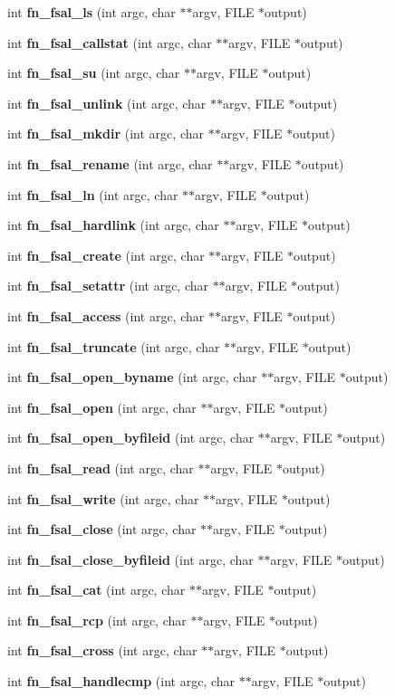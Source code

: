 \begin{CompactItemize}
int {\bf fn\_\-fsal\_\-ls} (int argc, char $\ast$$\ast$argv, FILE $\ast$output)
\item 
int {\bf fn\_\-fsal\_\-callstat} (int argc, char $\ast$$\ast$argv, FILE $\ast$output)
\item 
int {\bf fn\_\-fsal\_\-su} (int argc, char $\ast$$\ast$argv, FILE $\ast$output)
\item 
int {\bf fn\_\-fsal\_\-unlink} (int argc, char $\ast$$\ast$argv, FILE $\ast$output)
\item 
int {\bf fn\_\-fsal\_\-mkdir} (int argc, char $\ast$$\ast$argv, FILE $\ast$output)
\item 
int {\bf fn\_\-fsal\_\-rename} (int argc, char $\ast$$\ast$argv, FILE $\ast$output)
\item 
int {\bf fn\_\-fsal\_\-ln} (int argc, char $\ast$$\ast$argv, FILE $\ast$output)
\item 
int {\bf fn\_\-fsal\_\-hardlink} (int argc, char $\ast$$\ast$argv, FILE $\ast$output)
\item 
int {\bf fn\_\-fsal\_\-create} (int argc, char $\ast$$\ast$argv, FILE $\ast$output)
\item 
int {\bf fn\_\-fsal\_\-setattr} (int argc, char $\ast$$\ast$argv, FILE $\ast$output)
\item 
int {\bf fn\_\-fsal\_\-access} (int argc, char $\ast$$\ast$argv, FILE $\ast$output)
\item 
int {\bf fn\_\-fsal\_\-truncate} (int argc, char $\ast$$\ast$argv, FILE $\ast$output)
\item 
int {\bf fn\_\-fsal\_\-open\_\-byname} (int argc, char $\ast$$\ast$argv, FILE $\ast$output)
\item 
int {\bf fn\_\-fsal\_\-open} (int argc, char $\ast$$\ast$argv, FILE $\ast$output)
\item 
int {\bf fn\_\-fsal\_\-open\_\-byfileid} (int argc, char $\ast$$\ast$argv, FILE $\ast$output)
\item 
int {\bf fn\_\-fsal\_\-read} (int argc, char $\ast$$\ast$argv, FILE $\ast$output)
\item 
int {\bf fn\_\-fsal\_\-write} (int argc, char $\ast$$\ast$argv, FILE $\ast$output)
\item 
int {\bf fn\_\-fsal\_\-close} (int argc, char $\ast$$\ast$argv, FILE $\ast$output)
\item 
int {\bf fn\_\-fsal\_\-close\_\-byfileid} (int argc, char $\ast$$\ast$argv, FILE $\ast$output)
\item 
int {\bf fn\_\-fsal\_\-cat} (int argc, char $\ast$$\ast$argv, FILE $\ast$output)
\item 
int {\bf fn\_\-fsal\_\-rcp} (int argc, char $\ast$$\ast$argv, FILE $\ast$output)
\item 
int {\bf fn\_\-fsal\_\-cross} (int argc, char $\ast$$\ast$argv, FILE $\ast$output)
\item 
int {\bf fn\_\-fsal\_\-handlecmp} (int argc, char $\ast$$\ast$argv, FILE $\ast$output)
\end{CompactItemize}


